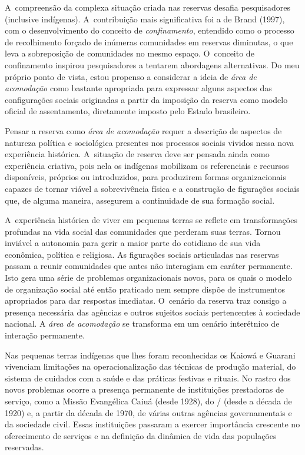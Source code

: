 A~compreensão da complexa situação criada nas reservas desafia
pesquisadores (inclusive indígenas). A~contribuição mais significativa
foi a de Brand (1997), com o desenvolvimento do conceito de \emph{confinamento},
entendido como o processo de recolhimento forçado de inúmeras
comunidades em reservas diminutas, o que leva a sobreposição de
comunidades no mesmo espaço. O~conceito de confinamento inspirou
pesquisadores a tentarem abordagens alternativas. Do meu próprio ponto
de vista, estou propenso a considerar a ideia de \emph{área de acomodação}
como bastante apropriada para expressar alguns aspectos das
configurações sociais originadas a partir da imposição da reserva como
modelo oficial de assentamento, diretamente imposto pelo Estado
brasileiro. 

Pensar a reserva como \emph{área de acomodação} requer a descrição de aspectos
de natureza política e sociológica presentes nos processos sociais
vividos nessa nova experiência histórica. A~situação de reserva deve
ser pensada ainda como experiência criativa, pois nela os indígenas
mobilizam os referenciais e recursos disponíveis, próprios ou
introduzidos, para produzirem formas organizacionais capazes de tornar
viável a sobrevivência física e a construção de figurações sociais que,
de alguma maneira, assegurem a continuidade de sua formação social. 

A~experiência histórica de viver em pequenas terras se reflete em
transformações profundas na vida social das comunidades que perderam
suas terras. Tornou inviável a autonomia para gerir a maior parte do
cotidiano de sua vida econômica, política e religiosa. As figurações
sociais articuladas nas reservas passam a reunir comunidades que antes
não interagiam em caráter permanente. Isto gera uma série de problemas
organizacionais novos, para os quais o modelo de organização social até
então praticado nem sempre dispõe de instrumentos apropriados para dar
respostas imediatas. O~cenário da reserva traz consigo a presença necessária das
agências e outros sujeitos sociais pertencentes à sociedade nacional. A
\emph{área de acomodação} se transforma em um cenário interétnico de interação
permanente.

Nas pequenas terras indígenas que lhes foram reconhecidas os Kaiowá e
Guarani vivenciam limitações na operacionalização das técnicas de
produção material, do sistema de cuidados com a saúde e das práticas
festivas e rituais. No rastro dos novos problemas ocorre a presença
permanente de instituições prestadoras de serviço, como a Missão
Evangélica Caiuá (desde 1928), do / (desde a década de 1920) e,
a partir da década de 1970, de várias outras agências governamentais e
da sociedade civil. Essas instituições passaram a exercer importância
crescente no oferecimento de serviços e na definição da dinâmica de
vida das populações reservadas.

